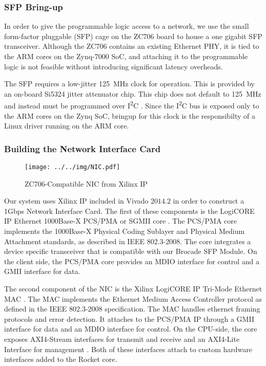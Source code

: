 \subsubsection {SFP Bring-up}
    In order to give the programmable logic access to a network, we use 
    the small form-factor pluggable (SFP) cage on the ZC706 board to house a 
    one gigabit SFP transceiver. Although the ZC706 contains an existing Ethernet
    PHY, it is tied to the ARM cores on the Zynq-7000 SoC, and attaching it to 
    the programmable logic is not feasible without introducing significant 
    latency overheads.

    The SFP requires a low-jitter \SI{125}{\mega\hertz} clock for operation. This is provided
    by an on-board Si5324 jitter attenuator chip. This chip does not default to 
    \SI{125}{\mega\hertz} and instead must be programmed over I\textsuperscript{2}C \cite{xapp1082}. Since the I\textsuperscript{2}C bus is exposed
    only to the ARM cores on the Zynq SoC, bringup for this clock is the 
    responsibilty of a Linux driver running on the ARM core.

\subsubsection{Building the Network Interface Card}

\begin{figure}[t]
\begin{center}
\texttt{[image: ../../img/NIC.pdf]}
\caption{ZC706-Compatible NIC from Xilinx IP}
\label{fig:nic}
\end{center}
\end{figure}

    Our system uses Xilinx IP included in Vivado $2014.2$ in order to construct 
    a 1Gbps Network Interface Card. The first of these components is the LogiCORE
    IP Ethernet 1000Base-X PCS/PMA or SGMII core \cite{pcspma}. The PCS/PMA
    core implements the 1000Base-X Physical Coding Sublayer and Physical Medium
    Attachment standards, as described in IEEE 802.3-2008. The core integrates
    a device specific transceiver that is compatible with our Brocade SFP Module.
    On the client side, the PCS/PMA core provides an MDIO interface for control
    and a GMII interface for data.

    The second component of the NIC is the Xilinx LogiCORE IP Tri-Mode Ethernet 
    MAC \cite{trimac}. The MAC implements the Ethernet Medium Access Controller
    protocol as defined in the IEEE 802.3-2008 specification. The MAC handles
    ethernet framing protocols and error detection. It attaches to the PCS/PMA
    IP through a GMII interface for data and an MDIO interface for control.
    On the CPU-side, the core exposes AXI4-Stream interfaces for transmit and 
    receive and an AXI4-Lite Interface for management \cite{axi}. Both of these
    interfaces attach to custom hardware interfaces added to the Rocket core.


